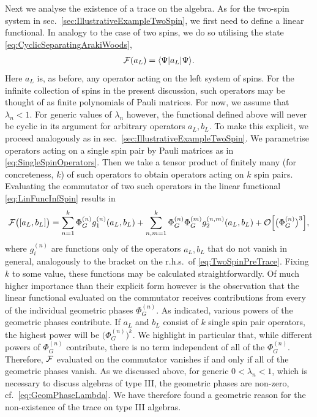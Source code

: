 \documentclass[a4paper,11pt]{article}
\newcommand{\1}{\mathds{1}}
\begin{document}
Next we analyse the existence of a trace on the algebra. As for the two-spin system in sec.~\ref{sec:IllustrativeExampleTwoSpin}, we first need to define a linear functional. In analogy to the case of two spins, we do so utilising the state \eqref{eq:CyclicSeparatingArakiWoods},
\begin{align}
    {\cal F}(a_L)=\langle\Psi|a_L|\Psi\rangle.\label{eq:LinFuncInfSpin}
\end{align}
Here $a_L$ is, as before, any operator acting on the left system of spins. For the infinite collection of spins in the present discussion, such operators may be thought of as finite polynomials of Pauli matrices. For now, we assume that $\lambda_n<1$. For generic values of $\lambda_n$ however, the functional defined above will never be cyclic in its argument for arbitrary operators $a_L,b_L$. To make this explicit, we proceed analogously as in sec.~\ref{sec:IllustrativeExampleTwoSpin}. We parametrise operators acting on a single spin pair by Pauli matrices as in \eqref{eq:SingleSpinOperators}. Then we take a tensor product of finitely many (for concreteness, $k$) of such operators to obtain operators acting on $k$ spin pairs. Evaluating the commutator of two such operators in the linear functional \eqref{eq:LinFuncInfSpin} results in
\begin{align}
    {\cal F}\big([a_L,b_L]\big)=\sum_{n=1}^k\Phi_G^{(n)}g_1^{(n)}(a_L,b_L)+\sum_{n,m=1}^k\Phi_G^{(n)}\Phi_G^{(m)}g_2^{(n,m)}(a_L,b_L)+\mathcal{O}\Big[\big(\Phi_G^{(n)}\big)^3\Big],\label{eq:CheckCyclicityTypeIII}
\end{align}
where $g_i^{(n)}$ are functions only of the operators $a_L,b_L$ that do not vanish in general, analogously to the bracket on the r.h.s.~of \eqref{eq:TwoSpinPreTrace}. Fixing $k$ to some value, these functions may be calculated straightforwardly. Of much higher importance than their explicit form however is the observation that the linear functional evaluated on the commutator receives contributions from every of the individual geometric phases $\Phi_G^{(n)}$. As indicated, various powers of the geometric phases contribute. If $a_L$ and $b_L$ consist of $k$ single spin pair operators, the highest power will be $\big(\Phi_G^{(n)}\big)^k$. We highlight in particular that, while different powers of $\Phi_G^{(n)}$ contribute, there is no term independent of all of the $\Phi_G^{(n)}$. Therefore, ${\cal F}$ evaluated on the commutator vanishes if and only if all of the geometric phases vanish. As we discussed above, for generic $0<\lambda_n<1$, which is necessary to discuss algebras of type III, the geometric phases are non-zero, cf.~\eqref{eq:GeomPhaseLambda}. We have therefore found a geometric reason for the non-existence of the trace on type III algebras.
\end{document}
